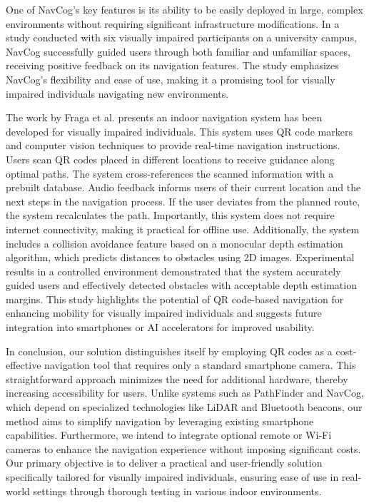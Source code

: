 One of NavCog's key features is its ability to be easily deployed in large, complex environments without requiring significant infrastructure modifications. In a study conducted with six visually impaired participants on a university campus, NavCog successfully guided users through both familiar and unfamiliar spaces, receiving positive feedback on its navigation features. The study emphasizes NavCog’s flexibility and ease of use, making it a promising tool for visually impaired individuals navigating new environments.


The work by Fraga et al. \cite{fraga2022} presents an indoor navigation system has been developed for visually impaired individuals. This system uses QR code markers and computer vision techniques to provide real-time navigation instructions. Users scan QR codes placed in different locations to receive guidance along optimal paths. The system cross-references the scanned information with a prebuilt database. Audio feedback informs users of their current location and the next steps in the navigation process. If the user deviates from the planned route, the system recalculates the path. Importantly, this system does not require internet connectivity, making it practical for offline use. Additionally, the system includes a collision avoidance feature based on a monocular depth estimation algorithm, which predicts distances to obstacles using 2D images. Experimental results in a controlled environment demonstrated that the system accurately guided users and effectively detected obstacles with acceptable depth estimation margins. This study highlights the potential of QR code-based navigation for enhancing mobility for visually impaired individuals and suggests future integration into smartphones or AI accelerators for improved usability.


In conclusion, our solution distinguishes itself by employing QR codes as a cost-effective navigation tool that requires only a standard smartphone camera. This straightforward approach minimizes the need for additional hardware, thereby increasing accessibility for users. Unlike systems such as PathFinder and NavCog, which depend on specialized technologies like LiDAR and Bluetooth beacons, our method aims to simplify navigation by leveraging existing smartphone capabilities. Furthermore, we intend to integrate optional remote or Wi-Fi cameras to enhance the navigation experience without imposing significant costs. Our primary objective is to deliver a practical and user-friendly solution specifically tailored for visually impaired individuals, ensuring ease of use in real-world settings through thorough testing in various indoor environments.
